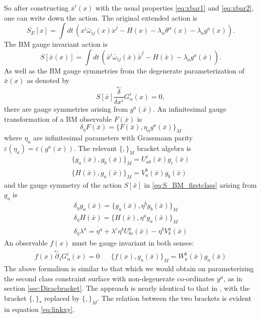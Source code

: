 \documentclass[a4paper,12pt]{article}
\theoremstyle{definition}
\theoremstyle{remark}
\numberwithin{equation}{section}
\newcommand{\al}{\alpha}
\newcommand{\de}{\delta}
\newcommand{\la}{\lambda}
\newcommand{\om}{\omega}
\newcommand{\eps}{\varepsilon}
\newcommand{\bx}{\bar{x}}
\newcommand{\pl}{\overset{\leftarrow}{\partial}}
\newcommand{\dl}{\overset{\leftarrow}{\delta}}
\begin{document}
So after constructing $\bx^i(x)$ with the usual
properties \eqref{eq:xbar1} and \eqref{eq:xbar2}, one can write
down the action. The original extended action is
\begin{equation}
S_E[x]=\int{dt\, (x^i \bar{\om}_{ij}(x) \dot{x}^j
-H(x)-\lambda_{\al}\theta^{\al}(x) - \lambda_a g^a(x))}.
\end{equation}
The BM gauge invariant action is
\begin{equation}\label{eq:S_BM_firstclass}
S[\bx(x)]=\int{dt\, (\bx^i \bar{\om}_{ij}(\bx) \dot{\bx}^j -H(\bx)
-\lambda_a g^a(\bx))}.
\end{equation}
As well as the BM gauge symmetries from the degenerate
parameterization of $\bx(x)$ as denoted by
\begin{equation}
S[\bx]\frac{\dl}{\de x^i} G^i_{\al}(x)=0,
\end{equation}
there are gauge symmetries arising from $g^a(\bx)$. An
infinitesimal gauge transformation of a BM observable $F(\bx)$ is
\begin{equation}
\de_{\eta}F(\bx) =  \{F(\bx),\eta_a g^a(\bx)\}_M
\end{equation}
where $\eta_a$ are infinitesimal parameters with Grassmann parity
$\eps(\eta_a)=\eps(g^a(x))$. The relevant $\{,\}_M$ bracket
algebra is
\begin{eqnarray}
\{g_a(\bx),g_b(\bx)\}_M=U^c_{ab}(\bx)g_c(\bx) \\
\{H(\bx),g_a(\bx)\}_M=V_a^b(\bx)g_b(\bx)
\end{eqnarray}
and the gauge symmetry of the action $S[\bx]$ in
\eqref{eq:S_BM_firstclass} arising from $g_a$ is
\begin{eqnarray}
\de_{\eta} g_a(\bx)=\{g_a(\bx),\eta^b g_b(\bx)\}_M \\
\de_{\eta} H(\bx)=\{H(\bx), \eta^a g_a(\bx)\}_M \\
\de_{\eta} \la^a=\dot{\eta^a} + \la^c \eta^b U^a_{bc}(\bx) -\eta^b
V_b^a(\bx)
\end{eqnarray}
An observable $f(x)$ must be gauge invariant in both senses:
\begin{eqnarray}
f(x)\pl_i G^i_{\al}(x)=0 && \{f(x),g_a(\bx)\}_M=
W^b_a(\bx)g_a(\bx)
\end{eqnarray}
The above formalism is similar to that which we would obtain on
parameterizing the second class constraint surface with
non-degenerate co-ordinates $y^\mu$, as in section
\ref{sec:Diracbracket}. The approach is nearly identical to that
in \cite{Henneaux:1992ig}, with the bracket $\{,\}_*$ replaced by
$\{,\}_M$. The relation between the two brackets is evident in
equation \eqref{eq:linkxy}.
\end{document}
